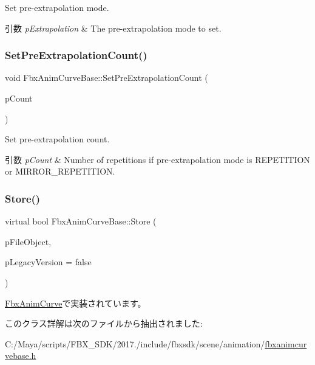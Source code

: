 Set pre-\/extrapolation mode. 
\begin{DoxyParams}{引数}
{\em p\+Extrapolation} & The pre-\/extrapolation mode to set. \\
\hline
\end{DoxyParams}
\mbox{\label{class_fbx_anim_curve_base_a9103e7ae34ef31d2952df0684cda6754}} 
\subsubsection{\texorpdfstring{Set\+Pre\+Extrapolation\+Count()}{SetPreExtrapolationCount()}}
{\footnotesize\ttfamily void Fbx\+Anim\+Curve\+Base\+::\+Set\+Pre\+Extrapolation\+Count (\begin{DoxyParamCaption}\item[{unsigned long}]{p\+Count }\end{DoxyParamCaption})}

Set pre-\/extrapolation count. 
\begin{DoxyParams}{引数}
{\em p\+Count} & Number of repetitions if pre-\/extrapolation mode is R\+E\+P\+E\+T\+I\+T\+I\+ON or M\+I\+R\+R\+O\+R\+\_\+\+R\+E\+P\+E\+T\+I\+T\+I\+ON. \\
\hline
\end{DoxyParams}
\mbox{\label{class_fbx_anim_curve_base_a82eba55521f1c0e792b71cb432dac170}} 
\subsubsection{\texorpdfstring{Store()}{Store()}}
{\footnotesize\ttfamily virtual bool Fbx\+Anim\+Curve\+Base\+::\+Store (\begin{DoxyParamCaption}\item[{\hyperlink{class_fbx_i_o}{Fbx\+IO} $\ast$}]{p\+File\+Object,  }\item[{bool}]{p\+Legacy\+Version = {\ttfamily false} }\end{DoxyParamCaption})\hspace{0.3cm}{\ttfamily [pure virtual]}}



\hyperlink{class_fbx_anim_curve_a0ef3229e43aaca33ab50161235541060}{Fbx\+Anim\+Curve}で実装されています。



このクラス詳解は次のファイルから抽出されました\+:\begin{DoxyCompactItemize}
\item 
C\+:/\+Maya/scripts/\+F\+B\+X\+\_\+\+S\+D\+K/2017./include/fbxsdk/scene/animation/\hyperlink{fbxanimcurvebase_8h}{fbxanimcurvebase.\+h}\end{DoxyCompactItemize}
